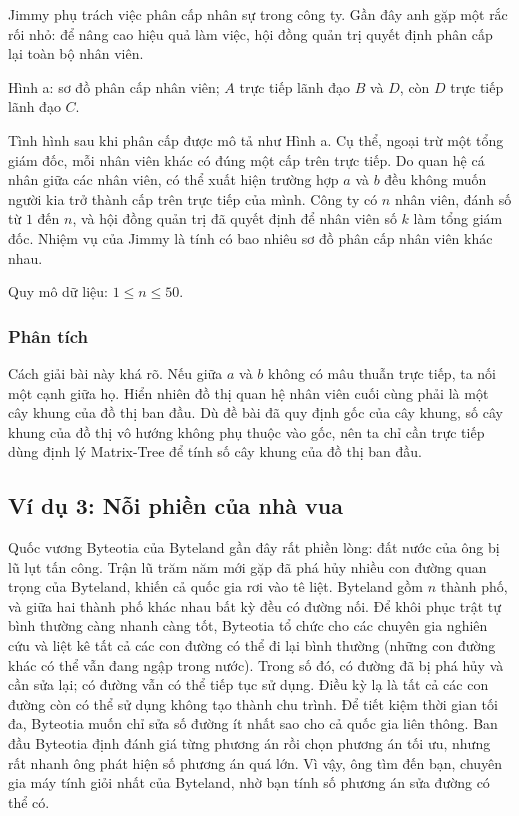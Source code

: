 \documentclass[11pt]{article}
\begin{document}
Jimmy phụ trách việc phân cấp nhân sự trong công ty. Gần đây anh gặp một rắc
rối nhỏ: để nâng cao hiệu quả làm việc, hội đồng quản trị quyết định phân cấp
lại toàn bộ nhân viên.

\begin{center}
  \small Hình a: sơ đồ phân cấp nhân viên; \(A\) trực tiếp lãnh đạo \(B\) và
  \(D\), còn \(D\) trực tiếp lãnh đạo \(C\).
\end{center}

Tình hình sau khi phân cấp được mô tả như Hình a. Cụ thể, ngoại trừ một tổng
giám đốc, mỗi nhân viên khác có đúng một cấp trên trực tiếp. Do quan hệ cá
nhân giữa các nhân viên, có thể xuất hiện trường hợp \(a\) và \(b\) đều không
muốn người kia trở thành cấp trên trực tiếp của mình. Công ty có \(n\) nhân
viên, đánh số từ \(1\) đến \(n\), và hội đồng quản trị đã quyết định để nhân
viên số \(k\) làm tổng giám đốc. Nhiệm vụ của Jimmy là tính có bao nhiêu sơ đồ
phân cấp nhân viên khác nhau.

Quy mô dữ liệu: \(1\le n\le 50\).

\subsubsection*{Phân tích}

Cách giải bài này khá rõ. Nếu giữa \(a\) và \(b\) không có mâu thuẫn trực tiếp,
ta nối một cạnh giữa họ. Hiển nhiên đồ thị quan hệ nhân viên cuối cùng phải là
một cây khung của đồ thị ban đầu. Dù đề bài đã quy định gốc của cây khung,
số cây khung của đồ thị vô hướng không phụ thuộc vào gốc, nên ta chỉ cần trực
tiếp dùng định lý Matrix-Tree để tính số cây khung của đồ thị ban đầu.

\subsection*{Ví dụ 3: Nỗi phiền của nhà vua}

Quốc vương Byteotia của Byteland gần đây rất phiền lòng: đất nước của ông bị
lũ lụt tấn công. Trận lũ trăm năm mới gặp đã phá hủy nhiều con đường quan
trọng của Byteland, khiến cả quốc gia rơi vào tê liệt. Byteland gồm \(n\)
thành phố, và giữa hai thành phố khác nhau bất kỳ đều có đường nối. Để khôi
phục trật tự bình thường càng nhanh càng tốt, Byteotia tổ chức cho các chuyên
gia nghiên cứu và liệt kê tất cả các con đường có thể đi lại bình thường
(những con đường khác có thể vẫn đang ngập trong nước). Trong số đó, có đường
đã bị phá hủy và cần sửa lại; có đường vẫn có thể tiếp tục sử dụng. Điều kỳ
lạ là tất cả các con đường còn có thể sử dụng không tạo thành chu trình. Để
tiết kiệm thời gian tối đa, Byteotia muốn chỉ sửa số đường ít nhất sao cho cả
quốc gia liên thông. Ban đầu Byteotia định đánh giá từng phương án rồi chọn
phương án tối ưu, nhưng rất nhanh ông phát hiện số phương án quá lớn. Vì vậy,
ông tìm đến bạn, chuyên gia máy tính giỏi nhất của Byteland, nhờ bạn tính số
phương án sửa đường có thể có.
\end{document}
